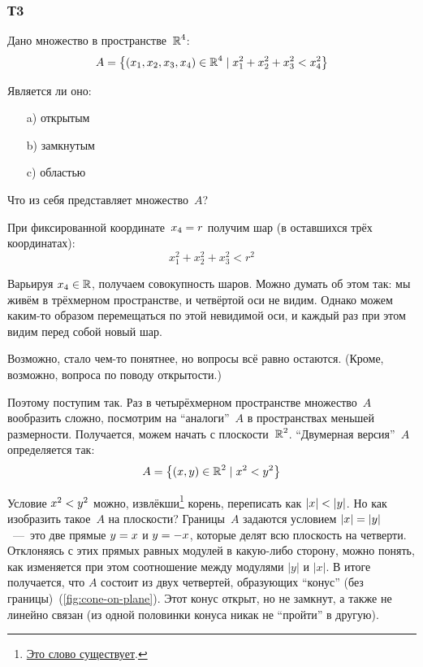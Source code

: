 \documentclass[a4paper,12pt]{article}
\begin{document}
  \subsubsection{Т3}

  Дано множество в пространстве~$\operatorname{\mathbb R}^4$:
  \[
    A = \bigl\{
      (x_1, x_2, x_3, x_4) \in \operatorname{\mathbb R}^4 \mid x_1^2 + x_2^2 + x_3^2 < x_4^2
    \bigr\}
  \]

  Является ли оно:
  \begin{enumerate}
    \item[a)] открытым
    \item[b)] замкнутым
    \item[c)] областью
  \end{enumerate}
  
  \begin{solution}
    Что из себя представляет множество~$A$?

    При фиксированной координате~$x_4 \hm= r$ получим шар (в оставшихся трёх координатах):
    \[
      x_1^2 + x_2^2 + x_3^2 < r^2
    \]

    Варьируя $x_4 \in \operatorname{\mathbb R}$, получаем совокупность шаров.
    Можно думать об этом так: мы живём в трёхмерном пространстве, и четвёртой оси не видим.
    Однако можем каким-то образом перемещаться по этой невидимой оси, и каждый раз при этом видим перед собой новый шар.

    Возможно, стало чем-то понятнее, но вопросы всё равно остаются.
    (Кроме, возможно, вопроса по поводу открытости.)

    Поэтому поступим так.
    Раз в четырёхмерном пространстве множество~$A$ вообразить сложно, посмотрим на ``аналоги''~$A$ в пространствах меньшей размерности.
    Получается, можем начать с плоскости~$\operatorname{\mathbb R}^2$.
    ``Двумерная версия''~$A$ определяется так:
    \[
      A = \bigl\{
        (x, y) \in \operatorname{\mathbb R}^2 \mid x^2 < y^2
      \bigr\}
    \]

    Условие $x^2 \hm< y^2$ можно, извлёкши\footnote{
      \href{https://w.wiki/DGjC}{Это слово существует}.
    } корень, переписать как $|x| \hm< |y|$.
    Но как изобразить такое~$A$ на плоскости?
    Границы~$A$ задаются условием $|x| \hm= |y|$~---~это две прямые $y \hm= x$ и $y \hm= -x$, которые делят всю плоскость на четверти.
    Отклоняясь с этих прямых равных модулей в какую-либо сторону, можно понять, как изменяется при этом соотношение между модулями $|y|$ и $|x|$.
    В итоге получается, что $A$ состоит из двух четвертей, образующих ``конус'' (без границы)~(\ref{fig:cone-on-plane}).
    Этот конус открыт, но не замкнут, а также не линейно связан (из одной половинки конуса никак не ``пройти'' в другую).


\end{solution}
\end{document}
